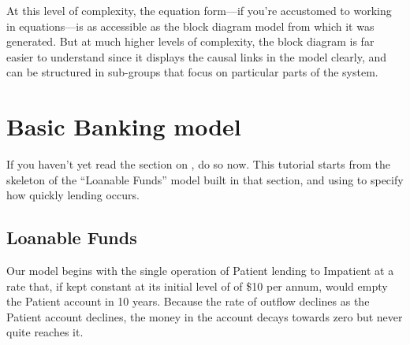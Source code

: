 At this level of complexity, the equation form---if you're accustomed
to working in equations---is as accessible as the block diagram model from
which it was generated. But at much higher levels of complexity, the
block diagram is far easier to understand since it displays the causal
links in the model clearly, and can be structured in sub-groups that
focus on particular parts of the system. 

\section{Basic Banking model}\label{tut:basicBankModel}

If you haven't yet read the section on , do so now. This tutorial starts from the
skeleton of the ``Loanable Funds'' model built in that section, and
using  to specify how quickly
lending occurs.  


\subsection{Loanable Funds}

Our model begins with the single operation of Patient lending to
Impatient at a rate that, if kept constant at its initial level of of
\$10 per annum, would empty the Patient account in 10 years. Because
the rate of outflow declines as the Patient account declines, the
money in the account decays towards zero but never quite reaches it.

\begin{center}
\end{center}

